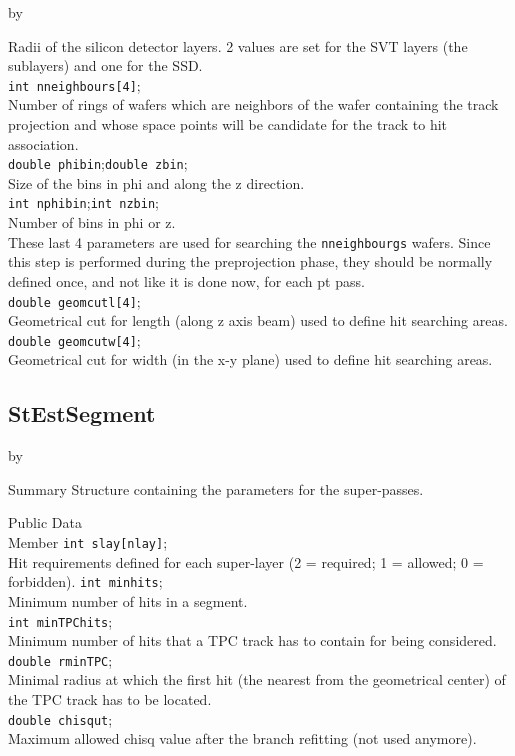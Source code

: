 \documentclass[twoside]{article}
\newcommand{\entrylabel}[1]{\mbox{\textbf{{#1}}}\hfil}%
\newenvironment{entry}
{\begin{list}{}%
    {\renewcommand{\makelabel}{\entrylabel}%
     \setlength{\labelwidth}{90pt}%
     \setlength{\leftmargin}{\labelwidth}
     \advance\leftmargin by \labelsep%
      }%
    }%
  {\end{list}}
\newcommand{\Entrylabel}[1]%
{\raisebox{0pt}[1ex][0pt]{\makebox[\labelwidth][l]%
    {\parbox[t]{\labelwidth}{\hspace{0pt}\textbf{{#1}}}}}}
\newenvironment{Entry}%
{\renewcommand{\entrylabel}{\Entrylabel}\begin{entry}}%
  {\end{entry}}
\begin{document}
\begin{Entry}
Radii of the silicon detector layers. 2 values are set for the SVT layers (the sublayers)
and one for the SSD.\\
\verb+int nneighbours[4]+;\\
Number of rings of wafers which are neighbors of the wafer containing the track
projection and whose space points will be candidate for the track to
hit association.\\
\verb+double phibin+;\verb+double zbin+;\\
Size of the bins in phi and along the z direction.\\
\verb+int nphibin+;\verb+int nzbin+;\\
Number of bins in phi or z. \\ 
These last 4 parameters are used for
searching the \verb+nneighbourgs+ wafers. Since this step is performed
during the preprojection phase, they should be normally defined once,
and not like it is done now, for each pt pass.  \\
\verb+double geomcutl[4]+;\\
Geometrical cut for length (along z axis beam) used to define hit
searching areas.\\
\verb+double geomcutw[4]+;\\
Geometrical cut for width (in the x-y plane) used to define hit
searching areas.\\
\end{Entry}
%
%
\subsection{StEstSegment}
\label{sec:StestSegmentq}
\begin{Entry}
\item[Summary]
Structure containing the parameters for the super-passes.
\item[Public Data\\ Member]
\verb+int slay[nlay]+;\\
Hit requirements defined for each super-layer (2 = required; 1 =
allowed; 0 = forbidden).
\verb+int minhits+;\\
Minimum number of hits in a segment.\\
\verb+int minTPChits+;\\
Minimum number of hits that a TPC track has to contain for being
considered. \\
\verb+double rminTPC+;\\
Minimal radius at which the first hit (the nearest from the
geometrical center) of the TPC track has to be located. \\
\verb+double chisqut+; \\
Maximum allowed chisq value after the branch refitting (not used
anymore).\\
\end{Entry}
%
%
\end{document}
